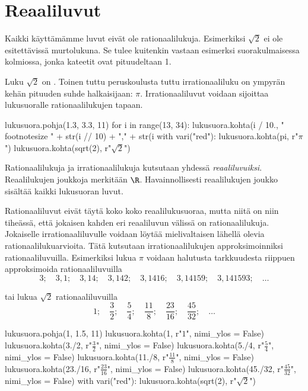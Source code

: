 \section{Reaaliluvut}

Kaikki käyttämämme luvut eivät ole rationaalilukuja. Esimerkiksi $\sqrt{2}$ ei ole esitettävissä murtolukuna. Se tulee kuitenkin vastaan esimerksi suorakulmaisessa kolmiossa, jonka kateetit ovat pituudeltaan 1.


Luku $\sqrt{2}$ on . Toinen tuttu peruskoulusta tuttu irrationaaliluku on ympyrän kehän pituuden suhde halkaisijaan: $\pi$. Irrationaaliluvut voidaan sijoittaa
lukusuoralle rationaalilukujen tapaan.

\begin{kuva}
lukusuora.pohja(1.3, 3.3, 11)
for i in range(13, 34):
	lukusuora.kohta(i / 10., "\\footnotesize " + str(i // 10) + "," + str(i %
with vari("red"):
	lukusuora.kohta(pi, r"$\pi$")
	lukusuora.kohta(sqrt(2), r"$\sqrt{2}$")
\end{kuva}



Rationaalilukuja ja irrationaalilukuja kutsutaan yhdessä \emph{reaaliluvuiksi}. Reaalilukujen joukkoja merkitään $\R$.
Havainnollisesti reaalilukujen joukko sisältää kaikki lukusuoran luvut.

Rationaaliluvut eivät täytä koko koko reaalilukusuoraa, mutta niitä on niin tiheässä, että jokaisen kahden eri reaaliluvun välissä on rationaalilukuja. Jokaiselle irrationaaliluvulle voidaan löytää mielivaltaisen lähellä olevia rationaalilukuarvioita. Tätä kutsutaan irrationaalilukujen approksimoinniksi rationaaliluvuilla. Esimerkiksi lukua $\pi$ voidaan halutusta tarkkuudesta riippuen approksimoida rationaaliluvuilla
\[
3; \quad 3,1; \quad 3,14; \quad 3,142; \quad 3,1416; \quad 3,14159; \quad 3,141593; \quad \ldots 
\]

tai lukua $\sqrt{2}$ rationaaliluvuilla
\[
1; \quad \frac{3}{2}; \quad \frac{5}{4}; \quad \frac{11}{8}; \quad \frac{23}{16}; \quad \frac{45}{32}; \quad \ldots 
\]

\begin{kuva}
lukusuora.pohja(1, 1.5, 11)
lukusuora.kohta(1, r"\footnotesize $1$", nimi_ylos = False)
lukusuora.kohta(3./2, r"\footnotesize $\frac{3}{2}$", nimi_ylos = False)
lukusuora.kohta(5./4, r"\footnotesize $\frac{5}{4}$", nimi_ylos = False)
lukusuora.kohta(11./8, r"\footnotesize $\frac{11}{8}$", nimi_ylos = False)
lukusuora.kohta(23./16, r"\footnotesize $\frac{23}{16}$", nimi_ylos = False)
lukusuora.kohta(45./32, r"\footnotesize $\frac{45}{32}$", nimi_ylos = False)
with vari("red"):
	lukusuora.kohta(sqrt(2), r"$\sqrt{2}$")
\end{kuva}

